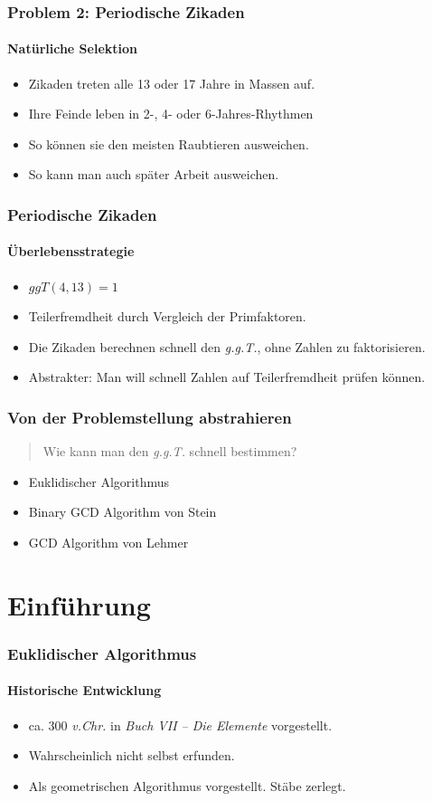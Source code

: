 \documentclass[•]{beamer}
\begin{document}
\begin{frame}
	\frametitle{Problem 2: Periodische Zikaden}
    \framesubtitle{Nat\"urliche Selektion}
    \begin{itemize}
    \item Zikaden treten alle 13 oder 17 Jahre in Massen auf.
    \item Ihre Feinde leben in 2-, 4- oder 6-Jahres-Rhythmen
    \item So k\"onnen sie den meisten Raubtieren ausweichen.
    \item So kann man auch sp\"ater Arbeit ausweichen.
    \end{itemize}
\end{frame}

\begin{frame}
	\frametitle{Periodische Zikaden}
	\framesubtitle{\"Uberlebensstrategie}
\begin{itemize}
\item $\textit{ggT}(4,13) = 1$
\item Teilerfremdheit durch Vergleich der Primfaktoren.
\item Die Zikaden berechnen schnell den \textit{g.g.T.}, ohne Zahlen zu faktorisieren.
\item Abstrakter: Man will schnell Zahlen auf Teilerfremdheit pr\"ufen k\"onnen.
\end{itemize}
\end{frame}

\begin{frame}
\frametitle{Von der Problemstellung abstrahieren}
\begin{quote}
		Wie kann man den \textit{g.g.T.} schnell bestimmen?
	\end{quote}
	\begin{itemize}
	\item Euklidischer Algorithmus
	\item Binary GCD Algorithm von Stein
	\item GCD Algorithm von Lehmer
	\end{itemize}
\end{frame}

\section{Einf\"uhrung}

\begin{frame}       
	\frametitle{Euklidischer Algorithmus}
    \framesubtitle{Historische Entwicklung}
    \begin{itemize}
    \item  ca. 300 \textit{v.Chr.} in \textit{Buch VII -- Die Elemente} vorgestellt.
    \item Wahrscheinlich nicht selbst erfunden.
    \item Als geometrischen Algorithmus vorgestellt. St\"abe zerlegt.
    \end{itemize}
\end{frame}
\end{document}
